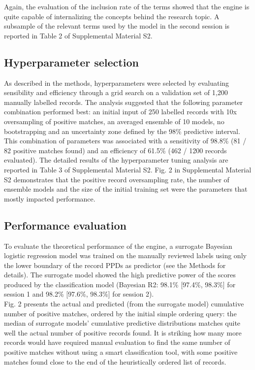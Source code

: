 \documentclass{article}
\begin{document}
Again, the evaluation of the inclusion rate of the terms showed that the
engine is quite capable of internalizing the concepts behind the
research topic. A subsample of the relevant terms used by the model in
the second session is reported in Table 2 of Supplemental Material S2.

\hypertarget{hyperparameter-selection}{%
\subsection{Hyperparameter selection}\label{hyperparameter-selection}}

As described in the methods, hyperparameters were selected by evaluating
sensibility and efficiency through a grid search on a validation set of
1,200 manually labelled records. The analysis suggested that the
following parameter combination performed best: an initial input of 250
labelled records with 10x oversampling of positive matches, an averaged
ensemble of 10 models, no bootstrapping and an uncertainty zone defined
by the 98\% predictive interval. This combination of parameters was
associated with a sensitivity of 98.8\% (81 / 82 positive matches found)
and an efficiency of 61.5\% (462 / 1200 records evaluated). The detailed
results of the hyperparameter tuning analysis are reported in Table 3 of
Supplemental Material S2. Fig. 2 in Supplemental Material S2
demonstrates that the positive record oversampling rate, the number of
ensemble models and the size of the initial training set were the
parameters that mostly impacted performance.

\hypertarget{performance-evaluation-1}{%
\subsection{Performance evaluation}\label{performance-evaluation-1}}

To evaluate the theoretical performance of the engine, a surrogate
Bayesian logistic regression model was trained on the manually reviewed
labels using only the lower boundary of the record PPDs as predictor
(see the Methods for details). The surrogate model showed the high
predictive power of the scores produced by the classification model
(Bayesian R2: 98.1\% {[}97.4\%, 98.3\%{]} for session 1 and 98.2\%
{[}97.6\%, 98.3\%{]} for session 2).\\

Fig. 2 presents the actual and predicted (from the surrogate model)
cumulative number of positive matches, ordered by the initial simple
ordering query: the median of surrogate models' cumulative predictive
distributions matches quite well the actual number of positive records
found. It is striking how many more records would have required manual
evaluation to find the same number of positive matches without using a
smart classification tool, with some positive matches found close to the
end of the heuristically ordered list of records.\\
\end{document}
